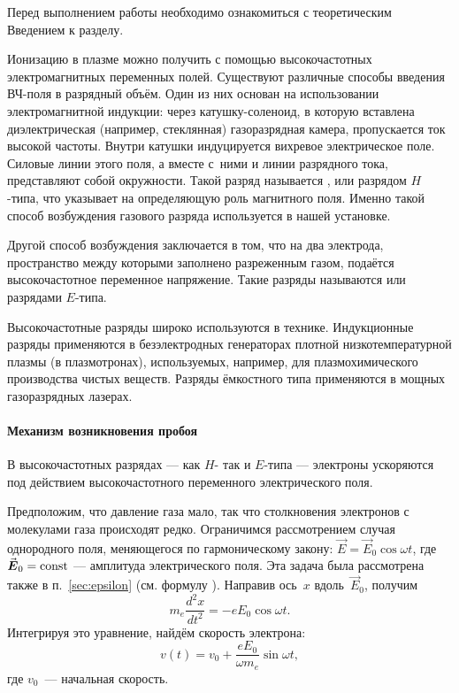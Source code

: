 


Перед выполнением работы необходимо ознакомиться с
теоретическим Введением к разделу.

Ионизацию в плазме можно получить с помощью высокочастотных электромагнитных
переменных полей. Существуют различные способы введения ВЧ-поля
в разрядный объём. Один из них основан на использовании электромагнитной
индукции: через катушку-соленоид, в которую вставлена диэлектрическая
(например, стеклянная) газоразрядная камера, пропускается ток высокой частоты.
Внутри катушки индуцируется вихревое электрическое поле.
Силовые линии этого поля, а вместе с~ними и линии разрядного тока,
представляют собой окружности. Такой разряд  называется ,
 или разрядом $H$-типа, что указывает
на определяющую роль магнитного поля. 
Именно такой способ возбуждения газового разряда используется в нашей установке.

Другой способ возбуждения заключается в том, что на два электрода,
пространство между которыми заполнено разреженным газом,
подаётся высокочастотное переменное напряжение. 
Такие разряды называются  или
разрядами $E$-типа.

Высокочастотные разряды широко используются в технике. Индукционные разряды
применяются в безэлектродных генераторах плотной низкотемпературной плазмы
(в плазмотронах), используемых, например, для плазмохимического производства
чистых веществ. Разряды ёмкостного типа применяются в мощных 
газоразрядных лазерах.

\paragraph{Механизм возникновения пробоя} 
В высокочастотных разрядах --- как $H$- так и $E$-типа --- электроны
ускоряются под действием высокочастотного переменного электрического поля.

Предположим, что давление газа мало, так что столкновения электронов
с молекулами газа происходят редко. 
Ограничимся рассмотрением случая однородного поля, 
меняющегося по гармоническому закону: $\vec{E}=\vec{E}_0 \cos \omega t$, 
где $\vec{E}_0=\const$ --- амплитуда электрического поля. 
Эта задача была рассмотрена также в п.~\ref{sec:epsilon} (см. формулу ).
Направив ось~$x$ вдоль~$\vec{E}_0$, получим
\[
    m_e\frac{d^2x}{dt^2}=-eE_0\cos\omega t.
\]
Интегрируя это уравнение, найдём скорость электрона:
\begin{equation*}
    v(t)=v_0+\frac{eE_0}{\omega m_e}\sin\omega t,
\end{equation*}
где $v_0$~--- начальная скорость.

